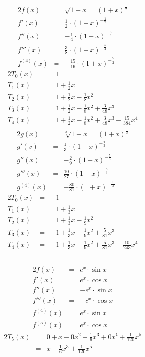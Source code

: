 \documentclass[10pt,a4paper,oneside,ngerman,numbers=noenddot]{scrartcl}
\begin{document}
\subsection{} %
\begin{alignat*}{2}
f(x) &=& \sqrt{1+x} = (1+x)^{\frac{1}{2}} \\
f'(x) &=& \frac{1}{2} \cdot (1+x)^{-\frac{1}{2}} \\
f''(x) &=& -\frac{1}{4} \cdot (1+x)^{-\frac{3}{2}} \\
f'''(x) &=& \frac{3}{8} \cdot (1+x)^{-\frac{5}{2}} \\
f^{(4)}(x) &=& -\frac{15}{16} \cdot (1+x)^{-\frac{7}{2}}
\end{alignat*}
\begin{alignat*}{2}
T_{0}(x) &=&& 1 \\
T_{1}(x) &=&& 1 + \frac{1}{2}x \\
T_{2}(x) &=&& 1 + \frac{1}{2}x - \frac{1}{8}x^{2}\\
T_{3}(x) &=&& 1 + \frac{1}{2}x - \frac{1}{8}x^{2} + \frac{3}{48}x^{3} \\
T_{4}(x) &=&& 1 + \frac{1}{2}x - \frac{1}{8}x^{2} + \frac{3}{48}x^{3} - \frac{15}{384}x^{4}
\end{alignat*}
\begin{alignat*}{2}
g(x) &=& \sqrt[3]{1+x} = (1+x)^{\frac{1}{3}} \\
g'(x) &=& \frac{1}{3} \cdot (1+x)^{-\frac{2}{3}} \\
g''(x) &=& -\frac{2}{9} \cdot (1+x)^{-\frac{5}{3}} \\
g'''(x) &=& \frac{10}{27} \cdot (1+x)^{-\frac{8}{3}} \\
g^{(4)}(x) &=& -\frac{80}{81} \cdot (1+x)^{-\frac{11}{3}}
\end{alignat*}
\begin{alignat*}{2}
T_{0}(x) &=&& 1 \\
T_{1}(x) &=&& 1 + \frac{1}{3}x \\
T_{2}(x) &=&& 1 + \frac{1}{3}x - \frac{1}{9}x^{2} \\
T_{3}(x) &=&& 1 + \frac{1}{3}x - \frac{1}{9}x^{2} + \frac{5}{81}x^{3} \\
T_{4}(x) &=&& 1 + \frac{1}{3}x - \frac{1}{9}x^{2} + \frac{5}{81}x^{3} - \frac{10}{243}x^{4}
\end{alignat*}
\subsection{} %
\begin{alignat*}{2}
f(x) &=& e^{x} \cdot \sin x \\
f'(x) &=& e^{x} \cdot \cos x \\
f''(x) &=& -e^{x} \cdot \sin x \\
f'''(x) &=& -e^{x} \cdot \cos x \\
f^{(4)}(x) &=& e^{x} \cdot \sin x \\
f^{(5)}(x) &=& e^{x} \cdot \cos x
\end{alignat*}
\begin{alignat*}{2}
T_{5}(x) &=& 0 + x - 0x^{2} - \frac{1}{6}x^{3} + 0x^{4} + \frac{1}{120}x^{5} \\
&=& x - \frac{1}{6}x^{3} + \frac{1}{120}x^{5}
\end{alignat*}
\end{document}
